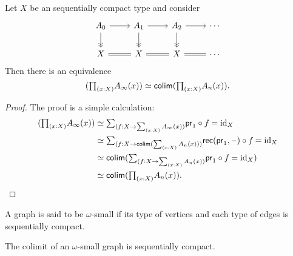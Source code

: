 \begin{lem}
Let $X$ be an sequentially compact type and consider
\begin{equation*}
\begin{tikzcd}
A_{0} \arrow[r] \arrow[d,->>] & A_{1} \arrow[r] \arrow[d,->>] & A_{2} \arrow[r] \arrow[d,->>] & \cdots \\
X \arrow[r,equals] & X \arrow[r,equals] & X \arrow[r,equals] & \cdots
\end{tikzcd}
\end{equation*}
Then there is an equivalence
\begin{equation*}
\eqv{(\prd{x:X} A_\infty(x))}{\tfcolim(\prd{x:X}A_n(x))}.
\end{equation*}
\end{lem}

\begin{proof}
The proof is a simple calculation:
\begin{align*}
(\prd{x:X} A_\infty(x)) & \eqvsym \sm{f:X\to\sm{x:X}A_\infty(x)}\id{\fst\circ f}{\catid{X}} \\
& \eqvsym \sm{f:X\to\tfcolim(\sm{x:X} A_n(x))}\id{\mathsf{rec}(\fst,\blank)\circ f}{\catid{X}} \\
& \eqvsym \tfcolim(\sm{f:X\to\sm{x:X}A_n(x)} \id{\fst\circ f}{\catid{X}}) \\
& \eqvsym \tfcolim(\prd{x:X}A_n(x)).\qedhere
\end{align*}
\end{proof}

\begin{defn}
A graph is said to be $\omega$-small if its type of vertices and each type of
edges is sequentially compact. 
\end{defn}

\begin{thm}
The colimit of an $\omega$-small graph is sequentially compact. 
\end{thm}

